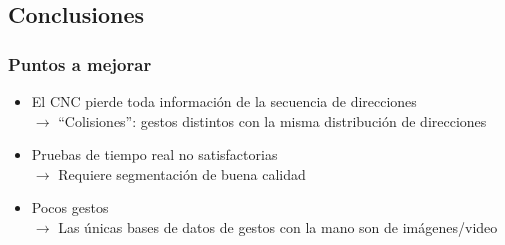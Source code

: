 %
%
%


\subsection{Conclusiones}
%

\begin{myframe}
\frametitle{Puntos a mejorar}
\begin{itemize}
\item El CNC pierde toda información de la secuencia de direcciones \\ 
$\rightarrow$ “Colisiones”: gestos distintos con la misma distribución de direcciones
\item Pruebas de tiempo real no satisfactorias \\
$\rightarrow$ Requiere segmentación de buena calidad
\item Pocos gestos \\
$\rightarrow$ Las únicas bases de datos de gestos con la mano son de imágenes/video
\end{itemize}
\end{myframe}

